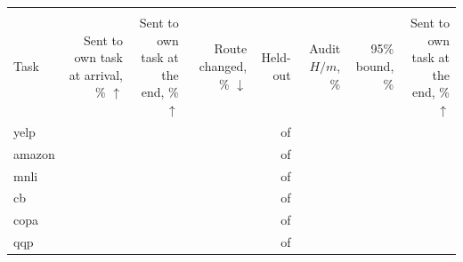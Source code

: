 {\footnotesize\setlength{\tabcolsep}{2.5pt}\begin{tabular}{lrrrrrrr}
    \toprule
    & \multicolumn{6}{c}{\recog{}} & \handicap{} \\
    \cmidrule(lr){2-7}
    Task & \shortstack[r]{Sent to\\own task\\at arrival,\\\% $\uparrow$} & \shortstack[r]{Sent to\\own task\\at the end,\\\% $\uparrow$} & \shortstack[r]{Route\\changed,\\\% $\downarrow$} & Held-out & \shortstack[r]{Audit\\$H/m$, \%} & \shortstack[r]{95\% bound,\\\%} & \shortstack[r]{Sent to\\own task\\at the end,\\\% $\uparrow$} \\
    \midrule
    yelp & \AudScaleLongPtOneArrive{} & \AudScaleLongPtOneEnd{} & \AudScaleLongPtOneChanged{} & \AudScaleLongPtOneC{} of \AudScaleLongPtOneM{} & \AudScaleLongPtOneAuditEst{} & \AudScaleLongPtOneBound{} & \AudScaleLongPtOneHEnd{} \\
    amazon & \AudScaleLongPtTwoArrive{} & \AudScaleLongPtTwoEnd{} & \AudScaleLongPtTwoChanged{} & \AudScaleLongPtTwoC{} of \AudScaleLongPtTwoM{} & \AudScaleLongPtTwoAuditEst{} & \AudScaleLongPtTwoBound{} & \AudScaleLongPtTwoHEnd{} \\
    mnli & \AudScaleLongPtThreeArrive{} & \AudScaleLongPtThreeEnd{} & \AudScaleLongPtThreeChanged{} & \AudScaleLongPtThreeC{} of \AudScaleLongPtThreeM{} & \AudScaleLongPtThreeAuditEst{} & \AudScaleLongPtThreeBound{} & \AudScaleLongPtThreeHEnd{} \\
    cb & \AudScaleLongPtFourArrive{} & \AudScaleLongPtFourEnd{} & \AudScaleLongPtFourChanged{} & \AudScaleLongPtFourC{} of \AudScaleLongPtFourM{} & \AudScaleLongPtFourAuditEst{} & \AudScaleLongPtFourBound{} & \AudScaleLongPtFourHEnd{} \\
    copa & \AudScaleLongPtFiveArrive{} & \AudScaleLongPtFiveEnd{} & \AudScaleLongPtFiveChanged{} & \AudScaleLongPtFiveC{} of \AudScaleLongPtFiveM{} & \AudScaleLongPtFiveAuditEst{} & \AudScaleLongPtFiveBound{} & \AudScaleLongPtFiveHEnd{} \\
    qqp & \AudScaleLongPtSixArrive{} & \AudScaleLongPtSixEnd{} & \AudScaleLongPtSixChanged{} & \AudScaleLongPtSixC{} of \AudScaleLongPtSixM{} & \AudScaleLongPtSixAuditEst{} & \AudScaleLongPtSixBound{} & \AudScaleLongPtSixHEnd{} \\

\end{tabular}}
